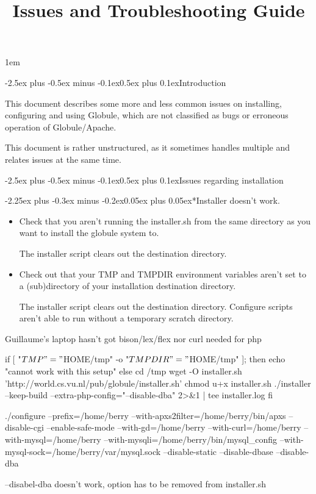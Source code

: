 \documentclass[10pt,twoside]{article}
\title{Issues and Troubleshooting Guide}
\date{Version 1.3.0
  \ifhevea \begin{rawhtml}</H3> 
<H3 ALIGN=center>\end{rawhtml} \else \\ \fi
  \ahrefurl{http://www.globule.org/}}
\author{\ahref{\url{http://www.halderen.net/}}{Berry~van~Halderen}}
\makeatletter
\def\section{\@startsection{section}{1}
{\z@}{-2.5ex plus -0.5ex minus -0.1ex}{0.5ex plus 0.1ex}{\large\bf}}
\def\subsection{\@startsection{subsection}{2}
{\z@}{-2.25ex plus -0.3ex minus -0.2ex}{0.05ex plus 0.05ex}{\normalsize\bf}}
\makeatother
\begin{document}
\maketitle

\tableofcontents
\cleardoublepage

\parindent 0pt
\parskip 1em

\section{Introduction}

This document describes some more and less common issues on installing,
configuring and using Globule, which are not classified as bugs or
erroneous operation of Globule/Apache.

This document is rather unstructured, as it sometimes handles multiple and
relates issues at the same time.

\section{Issues regarding installation}

\subsection*{Installer doesn't work.}

\begin{itemize}
\item Check that you aren't running the installer.sh from the same directory
as you want to install the globule system to.

The installer script clears out the destination directory.

\item Check out that your TMP and TMPDIR environment variables aren't set to a (sub)directory of your installation destination directory.

The installer script clears out the destination directory.  Configure scripts
aren't able to run without a temporary scratch directory.

\end{itemize}

\item Guillaume's laptop hasn't got bison/lex/flex nor curl needed for php

if [ "$TMP" = "$HOME/tmp" -o "$TMPDIR" = "$HOME/tmp" ]; then
  echo "cannot work with this setup"
else
  cd /tmp
  wget -O installer.sh 'http://world.cs.vu.nl/pub/globule/installer.sh'
  chmod u+x installer.sh
  ./installer --keep-build --extra-php-config="--disable-dba" 2>&1
  | tee installer.log
fi

./configure --prefix=/home/berry --with-apxs2filter=/home/berry/bin/apxs --disable-cgi --enable-safe-mode --with-gd=/home/berry --with-curl=/home/berry --with-mysql=/home/berry --with-mysqli=/home/berry/bin/mysql_config --with-mysql-sock=/home/berry/var/mysql.sock --disable-static --disable-dbase --disable-dba

--disabel-dba doesn't work, option has to be removed from installer.sh
\end{document}
